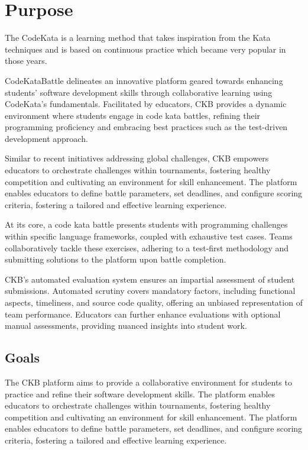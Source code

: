 \renewcommand{\arraystretch}{1.5} %

\section{Purpose}
\label{s:Purpose}%

The CodeKata is a learning method that takes inspiration from the Kata techniques and is based on continuous practice which became very popular in those years.

CodeKataBattle delineates an innovative platform geared towards enhancing students' software development skills through collaborative learning using CodeKata’s fundamentals. Facilitated by educators, CKB provides a dynamic environment where students engage in code kata battles, refining their programming proficiency and embracing best practices such as the test-driven development approach.

Similar to recent initiatives addressing global challenges, CKB empowers educators to orchestrate challenges within tournaments, fostering healthy competition and cultivating an environment for skill enhancement. The platform enables educators to define battle parameters, set deadlines, and configure scoring criteria, fostering a tailored and effective learning experience.

At its core, a code kata battle presents students with programming challenges within specific language frameworks, coupled with exhaustive test cases. Teams collaboratively tackle these exercises, adhering to a test-first methodology and submitting solutions to the platform upon battle completion.

CKB's automated evaluation system ensures an impartial assessment of student submissions. Automated scrutiny covers mandatory factors, including functional aspects, timeliness, and source code quality, offering an unbiased representation of team performance. Educators can further enhance evaluations with optional manual assessments, providing nuanced insights into student work.


\subsection{Goals}
\label{ss:goals}%
The CKB platform aims to provide a collaborative environment for students to practice and refine their software development skills. The platform enables educators to orchestrate challenges within tournaments, fostering healthy competition and cultivating an environment for skill enhancement. The platform enables educators to define battle parameters, set deadlines, and configure scoring criteria, fostering a tailored and effective learning experience.

